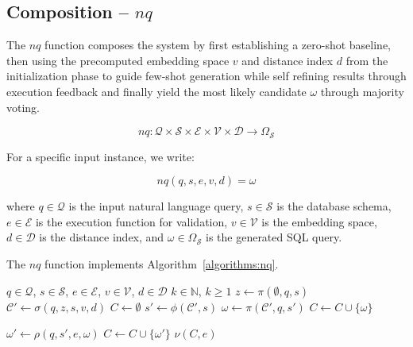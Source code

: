 \subsection{Composition – $nq$}

The $nq$ function composes the system by first establishing a
zero-shot baseline, then using the precomputed embedding space $v$ and distance
index $d$ from the initialization phase to guide few-shot generation while
self refining results through execution feedback and finally yield the most likely
candidate $\omega$ through majority voting.

$$
nq: \mathcal{Q} \times \mathcal{S} \times \mathcal{E} \times \mathcal{V} \times \mathcal{D} \rightarrow \Omega_{\mathcal{S}}
$$

\vspace{0.5em}

For a specific input instance, we write:

$$
nq(q, s, e, v, d) = \omega
$$

\vspace{0.5em}

where $q \in \mathcal{Q}$ is the input natural language query, $s \in \mathcal{S}$
is the database schema, $e \in \mathcal{E}$ is the execution function for validation,
$v \in \mathcal{V}$ is the embedding space, $d \in \mathcal{D}$ is the distance index,
and $\omega \in \Omega_{\mathcal{S}}$ is the generated SQL query.

\newpage

The $nq$ function implements Algorithm~\ref{algorithms:nq}.

\begin{algorithm}
\caption{$nq$}\label{algorithms:nq}
\begin{algorithmic}[1]
\Require $q \in \mathcal{Q}$, $s \in \mathcal{S}$, $e \in \mathcal{E}$, $v \in \mathcal{V}$, $d \in \mathcal{D}$
\Require $k \in \mathbb{N}$, $k \geq 1$             
\State $z \gets \pi(\emptyset, q, s)$               
\State $\mathcal{C}' \gets \sigma(q, z, s, v, d)$   
\State $C \gets \emptyset$                          
                                   
    \State $s' \gets \phi(\mathcal{C}', s)$         
    \State $\omega \gets \pi(\mathcal{C}', q, s')$  
                                
        \State $C \gets C \cup \{\omega\}$          
    \EndIf

    \State $\omega' \gets \rho(q, s', e, \omega)$   
                               
        \State $C \gets C \cup \{\omega'\}$         
    \EndIf
\EndWhile
\State \Return $\nu(C, e)$                          
\end{algorithmic}
\end{algorithm}

\newpage
